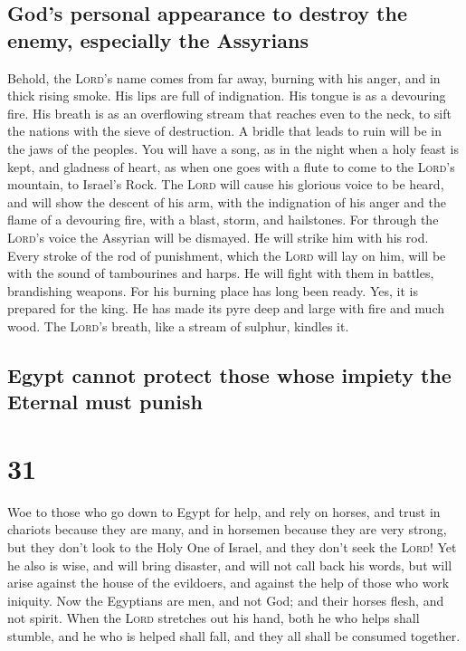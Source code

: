 \hypertarget{gods-personal-appearance-to-destroy-the-enemy-especially-the-assyrians}{%
\subsection{God's personal appearance to destroy the enemy, especially
the
Assyrians}\label{gods-personal-appearance-to-destroy-the-enemy-especially-the-assyrians}}

 Behold, the \textsc{Lord}'s name comes from far away,
burning with his anger, and in thick rising smoke. His lips are full of
indignation. His tongue is as a devouring fire.  His
breath is as an overflowing stream that reaches even to the neck, to
sift the nations with the sieve of destruction. A bridle that leads to
ruin will be in the jaws of the peoples.  You will have a
song, as in the night when a holy feast is kept, and gladness of heart,
as when one goes with a flute to come to the \textsc{Lord}'s mountain,
to Israel's Rock.  The \textsc{Lord} will cause his
glorious voice to be heard, and will show the descent of his arm, with
the indignation of his anger and the flame of a devouring fire, with a
blast, storm, and hailstones.  For through the
\textsc{Lord}'s voice the Assyrian will be dismayed. He will strike him
with his rod.  Every stroke of the rod of punishment,
which the \textsc{Lord} will lay on him, will be with the sound of
tambourines and harps. He will fight with them in battles, brandishing
weapons.  For his burning place has long been ready. Yes,
it is prepared for the king. He has made its pyre deep and large with
fire and much wood. The \textsc{Lord}'s breath, like a stream of
sulphur, kindles it.

\hypertarget{egypt-cannot-protect-those-whose-impiety-the-eternal-must-punish}{%
\subsection{Egypt cannot protect those whose impiety the Eternal must
punish}\label{egypt-cannot-protect-those-whose-impiety-the-eternal-must-punish}}

\hypertarget{section-30}{%
\section{31}\label{section-30}}

 Woe to those who go down to Egypt for help, and rely on
horses, and trust in chariots because they are many, and in horsemen
because they are very strong, but they don't look to the Holy One of
Israel, and they don't seek the \textsc{Lord}!  Yet he
also is wise, and will bring disaster, and will not call back his words,
but will arise against the house of the evildoers, and against the help
of those who work iniquity.  Now the Egyptians are men,
and not God; and their horses flesh, and not spirit. When the
\textsc{Lord} stretches out his hand, both he who helps shall stumble,
and he who is helped shall fall, and they all shall be consumed
together.

